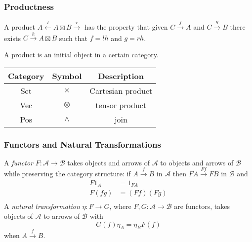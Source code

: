 \documentclass[12pt,fleqn]{beamer}
\begin{document}
\begin{frame}
\frametitle{Productness}
A product \(A\xleftarrow{l}A\boxtimes B\xrightarrow{r}\) has the
property that
given \(C\xrightarrow{f}A\) and \(C\xrightarrow{g}B\) there
exists \(C\xrightarrow{h}A\boxtimes B\) such that
\(f = lh\) and \(g = rh\).
\begin{quote}
\end{quote}
A product is an initial object in a certain category.
\begin{tabular}{|c|c|c|}
\hline 
Category & Symbol & Description \\ 
\hline 
Set & \(\times\) & Cartesian product \\ 
\hline 
Vec & \(\otimes\) & tensor product \\ 
\hline 
Pos & \(\wedge\) & join \\ 
\hline 
\end{tabular} 
\end{frame}

\begin{frame}
\frametitle{Functors and Natural Transformations}
A {\em functor} \(F\colon\mathcal{A}\to\mathcal{B}\) takes objects and
arrows of \(\mathcal{A}\) to objects and arrows of \(\mathcal{B}\) while
preserving the category structure:
if \(A\xrightarrow{f}B\) in \(\mathcal{A}\) then
\(FA\xrightarrow{Ff}FB\) in \(\mathcal{B}\) and
\begin{align*}
F1_A &= 1_{FA}\\
F(fg) &= (Ff)(Fg)\\
\end{align*}
A {\em natural transformation} \(\eta\colon F\to G\), where
\(F,G\colon\mathcal{A}\to\mathcal{B}\) are functors, takes
objects of \(\mathcal{A}\) to arrows of \(\mathcal{B}\) with 
\[G(f)\eta_A = \eta_BF(f)\]
when \(A\xrightarrow{f}B\).
\end{frame}
\end{document}
